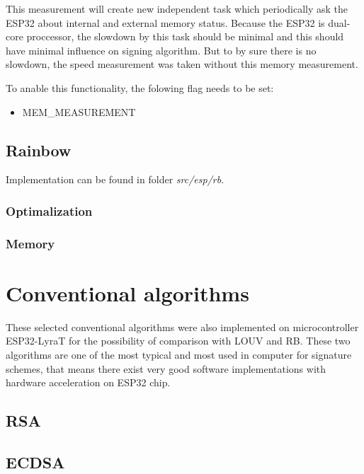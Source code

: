 \documentclass[thesis=M,english]{FITthesis}[2019/12/23]
\begin{document}
\bigskip
\noindent
This measurement will create new independent task which periodically ask the ESP32 about internal and external memory status. Because the ESP32 is dual-core proccessor, the slowdown by this task should be minimal and this should have minimal influence on signing algorithm. But to by sure there is no slowdown, the speed measurement was taken without this memory measurement.

\bigskip
\noindent
To anable this functionality, the folowing flag needs to be set:
\begin{itemize}
\item	MEM\_MEASUREMENT
\end{itemize}

\subsection{Rainbow}


\bigskip
\noindent
Implementation can be found in folder \textit{src/esp/rb}. 

\subsubsection{Optimalization}

\subsubsection{Memory}

\section{Conventional algorithms}
These selected conventional algorithms were also implemented on microcontroller ESP32-LyraT for the possibility of comparison with LOUV and RB. These two algorithms are one of the most typical and most used in computer for signature schemes, that means there exist very good software implementations with hardware acceleration on ESP32 chip. 

\subsection{RSA}

\subsection{ECDSA}
\end{document}
